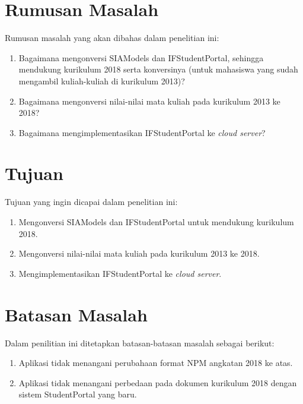 \section{Rumusan Masalah}
\label{sec:rumusan}
Rumusan masalah yang akan dibahas dalam penelitian ini:
\begin{enumerate}
	\item Bagaimana mengonversi SIAModels dan IFStudentPortal, sehingga mendukung kurikulum 2018 serta konversinya (untuk mahasiswa yang sudah mengambil kuliah-kuliah di kurikulum 2013)?
	\item Bagaimana mengonversi nilai-nilai mata kuliah pada kurikulum 2013 ke 2018?
	\item Bagaimana mengimplementasikan IFStudentPortal ke \textit{cloud server}?
\end{enumerate}

\section{Tujuan}
\label{sec:tujuan}
Tujuan yang ingin dicapai dalam penelitian ini:
\begin{enumerate}
	\item Mengonversi SIAModels dan IFStudentPortal untuk mendukung kurikulum 2018.
	\item Mengonversi nilai-nilai mata kuliah pada kurikulum 2013 ke 2018.
	\item Mengimplementasikan IFStudentPortal ke \textit{cloud server}.
\end{enumerate}

\section{Batasan Masalah}
\label{sec:batasan}
Dalam penilitian ini ditetapkan batasan-batasan masalah sebagai berikut:
\begin{enumerate}
	\item Aplikasi tidak menangani perubahaan format NPM angkatan 2018 ke atas.
	\item Aplikasi tidak menangani perbedaan pada dokumen kurikulum 2018 dengan sistem StudentPortal yang baru.
\end{enumerate}


